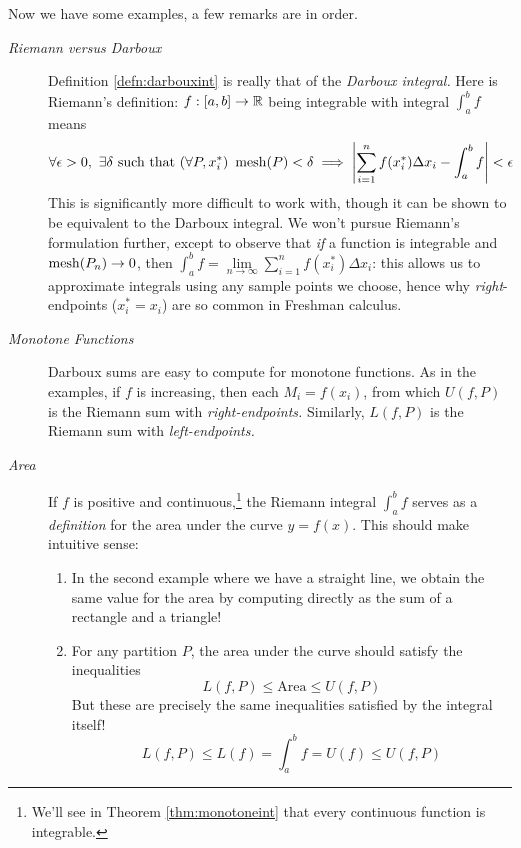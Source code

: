 \label{pg:riemanndefthm}
Now we have some examples, a few remarks are in order.
\begin{description}
  \item[\normalfont\emph{Riemann versus Darboux} ] Definition \ref{defn:darbouxint} is really that of the \emph{Darboux integral.} Here is Riemann's definition: $f:[a,b]\to\mathbb{R}$ being integrable with integral $\int_a^bf$ means
	\begin{gather*}
		\forall\epsilon>0,\ \exists\delta\text{ such that }(\forall P,x_i^*)\ \operatorname{mesh}(P)<\delta\implies \left| \sum_{i=1}^nf(x_i^*)\Delta x_i-\int_a^bf\right|<\epsilon
	\end{gather*}
	This is significantly more difficult to work with, though it can be shown to be equivalent to the Darboux integral. We won't pursue Riemann's formulation further, except to observe that \emph{if} a function is integrable and $\operatorname{mesh}(P_n)\to 0$, then $\int_a^b f=\lim\limits_{n\to\infty}\sum_{i=1}^nf(x_i^*)\Delta x_i$: this allows us to approximate integrals using any sample points we choose, hence why \emph{right}-endpoints ($x_i^*=x_i$) are so common in Freshman calculus.
  \item[\normalfont\emph{Monotone Functions} ] Darboux sums are easy to compute for monotone functions. As in the examples, if $f$ is increasing, then each $M_i=f(x_i)$, from which $U(f,P)$ is the Riemann sum with \emph{right-endpoints.} Similarly, $L(f,P)$ is the Riemann sum with \emph{left-endpoints.} %
  \item[\normalfont\emph{Area} ] If $f$ is positive and continuous,\footnote{%
  	We'll see in Theorem \ref{thm:monotoneint} that every continuous function is integrable.%
  } the Riemann integral $\int_a^bf$ serves as a \emph{definition} for the area under the curve $y=f(x)$. This should make intuitive sense:
  \begin{enumerate}
    \item In the second example where we have a straight line, we obtain the same value for the area by computing directly as the sum of a rectangle and a triangle!
    \item For any partition $P$, the area under the curve should satisfy the inequalities
  	\[
  		L(f,P)\le \text{Area}\le U(f,P)
  	\]
  	But these are precisely the same inequalities satisfied by the integral itself!
  	\[
  		L(f,P)\le L(f)=\int_a^bf=U(f)\le U(f,P)
  	\]
  \end{enumerate}
\end{description}


